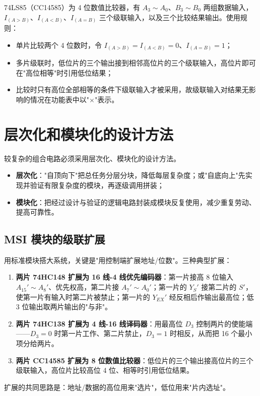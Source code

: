 74LS85（CC14585）为 4 位数值比较器，有 \(A_3\sim A_0\)、\(B_3\sim B_0\) 两组数据输入，\(I_{(A>B)}\)、\(I_{(A<B)}\)、\(I_{(A=B)}\) 三个级联输入，以及三个比较结果输出。使用规则：
\begin{itemize}
    \item 单片比较两个 4 位数时，令 \(I_{(A>B)}=I_{(A<B)}=0\)、\(I_{(A=B)}=1\)；
    \item 多片级联时，低位片的三个输出接到相邻高位片的三个级联输入，高位片即可在"高位相等"时引用低位结果；
    \item 比较时只有高位全部相等的条件下级联输入才被采用，故级联输入对结果无影响的情况在功能表中以"\(\times\)"表示。
\end{itemize}

\section{层次化和模块化的设计方法}
较复杂的组合电路必须采用层次化、模块化的设计方法。
\begin{itemize}
    \item \textbf{层次化}："自顶向下"把总任务分层分块，降低每层复杂度；或"自底向上"先实现并验证有限复杂度的模块，再逐级调用拼装；
    \item \textbf{模块化}：把经过设计与验证的逻辑电路封装成模块反复使用，减少重复劳动、提高可靠性。
\end{itemize}

\subsection{MSI 模块的级联扩展}
用标准模块搭大系统，关键是"用控制端扩展地址/位数"。三种典型扩展：
\begin{enumerate}
    \item \textbf{两片 74HC148 扩展为 16 线-4 线优先编码器}：第一片接高 8 位输入 \(A_{15}'\sim A_8'\)、优先权高，第二片接 \(A_7'\sim A_0'\)；第一片的 \(Y_S'\) 接第二片的 \(S'\)，使第一片有输入时第二片被禁止；第一片的 \(Y_{EX}'\) 经反相后作输出最高位；低 3 位输出取两片输出的"与非"。
    \item \textbf{两片 74HC138 扩展为 4 线-16 线译码器}：用最高位 \(D_3\) 控制两片的使能端——\(D_3=0\) 时第一片工作、第二片禁止，\(D_3=1\) 时相反，从而把 16 个最小项分给两片。
    \item \textbf{两片 CC14585 扩展为 8 位数值比较器}：低位片的三个输出接高位片的三个级联输入，高位片比较高位 4 位、相等时引用低位结果。
\end{enumerate}
扩展的共同思路是：地址/数据的高位用来"选片"，低位用来"片内选址"。

